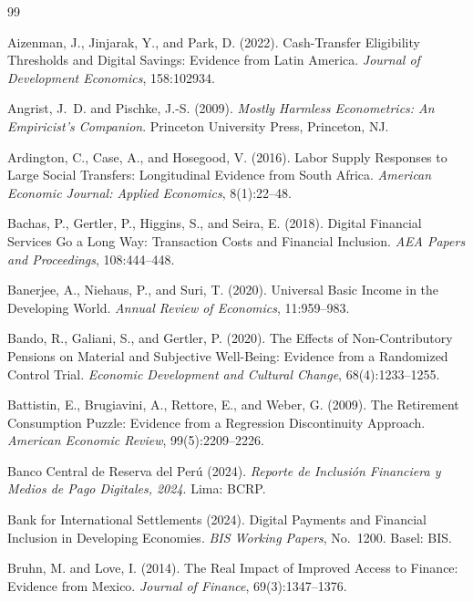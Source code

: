 \documentclass[12pt]{article}
\begin{document}
\begin{thebibliography}{99}

Aizenman, J., Jinjarak, Y., and Park, D. (2022).
Cash-Transfer Eligibility Thresholds and Digital Savings: Evidence from
Latin America.
\textit{Journal of Development Economics}, 158:102934.

Angrist, J.~D. and Pischke, J.-S. (2009).
\textit{Mostly Harmless Econometrics: An Empiricist's Companion}.
Princeton University Press, Princeton, NJ.

Ardington, C., Case, A., and Hosegood, V. (2016).
Labor Supply Responses to Large Social Transfers: Longitudinal Evidence
from South Africa.
\textit{American Economic Journal: Applied Economics}, 8(1):22--48.

Bachas, P., Gertler, P., Higgins, S., and Seira, E. (2018).
Digital Financial Services Go a Long Way: Transaction Costs and Financial
Inclusion.
\textit{AEA Papers and Proceedings}, 108:444--448.

Banerjee, A., Niehaus, P., and Suri, T. (2020).
Universal Basic Income in the Developing World.
\textit{Annual Review of Economics}, 11:959--983.

Bando, R., Galiani, S., and Gertler, P. (2020).
The Effects of Non-Contributory Pensions on Material and Subjective
Well-Being: Evidence from a Randomized Control Trial.
\textit{Economic Development and Cultural Change}, 68(4):1233--1255.

Battistin, E., Brugiavini, A., Rettore, E., and Weber, G. (2009).
The Retirement Consumption Puzzle: Evidence from a Regression Discontinuity
Approach.
\textit{American Economic Review}, 99(5):2209--2226.

Banco Central de Reserva del Per\'u (2024).
\textit{Reporte de Inclusi\'on Financiera y Medios de Pago Digitales, 2024}.
Lima: BCRP.

Bank for International Settlements (2024).
Digital Payments and Financial Inclusion in Developing Economies.
\textit{BIS Working Papers}, No.~1200. Basel: BIS.

Bruhn, M. and Love, I. (2014).
The Real Impact of Improved Access to Finance: Evidence from Mexico.
\textit{Journal of Finance}, 69(3):1347--1376.


\end{thebibliography}
\end{document}
